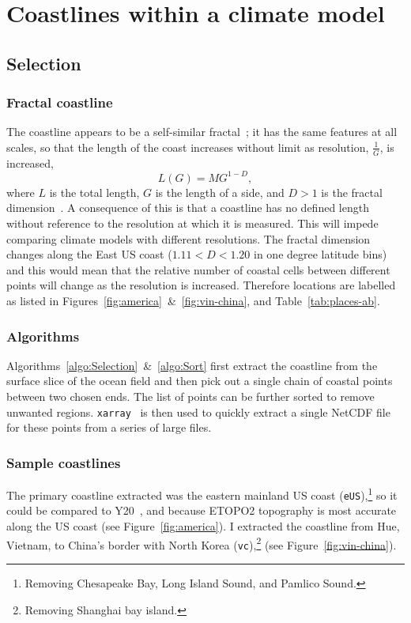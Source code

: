 

\section{Coastlines within a climate model}
\label{sec:coast}
\subsection{Selection}
 \subsubsection{Fractal coastline}
 \label{sec:fractal}
 The coastline appears to be a self-similar fractal~\cite{mandelbrot1967long,
 richardson1961problem}; it has the same features at all
 scales, so that the length of the coast increases without limit as resolution, $\frac{1}{G}$,
 is increased,
 \begin{equation}
 L(G)=M G^{1-D},
 \end{equation}
 where $L$ is the total length, $G$ is the length of a side,
 and $D>1$ is the fractal dimension~\cite{mandelbrot1967long}.
 A consequence of this is that a coastline has no defined length without
 reference to the resolution at which it is measured.
 This will impede comparing
 climate models with different resolutions.
 The fractal dimension changes
  along the East US coast ($1.11<D<1.20$
   in one degree latitude bins)~\cite{jiang1998fractal}
 and this would mean that the relative number of coastal cells between different
 points will change as the resolution is increased.
 Therefore locations are labelled as listed in
 Figures~\ref{fig:america}~\&~\ref{fig:vin-china}, and Table~\ref{tab:places-ab}.

\subsubsection{Algorithms}
\label{sec:coast-algorithms}
Algorithms~\ref{algo:Selection}~\&~\ref{algo:Sort} first extract the coastline
from the surface slice of the ocean field and then pick out a single chain of
coastal points between two chosen ends. The list of points can be further
sorted to remove unwanted regions.
\texttt{xarray}~\cite{hoyer2017xarray} is then used to quickly extract
a single NetCDF file for these points from a series of large files.





\subsubsection{Sample coastlines}
\label{sec:coast-sample}
The primary coastline extracted was the eastern mainland US coast (\texttt{eUS}),\footnote{
Removing Chesapeake Bay, Long Island Sound, and Pamlico Sound.
}
so it could be compared to Y20~\cite{ZannaPreprint},
and because ETOPO2 topography is most accurate along the
US coast (see Figure~\ref{fig:america}).
I extracted the coastline from Hue, Vietnam, to China's
border with North Korea (\texttt{vc}),\footnote{
Removing Shanghai bay island.} (see Figure~\ref{fig:vin-china}).

